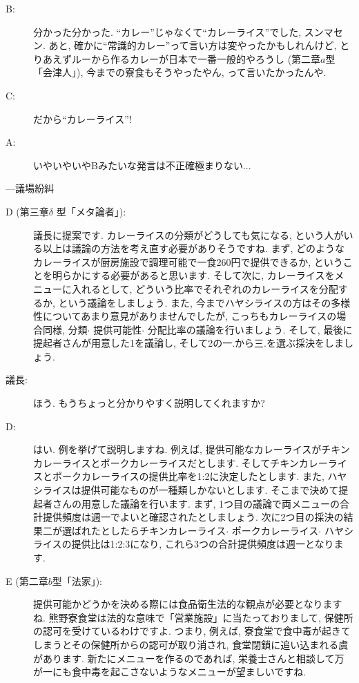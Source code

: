 \documentclass[10pt,b5jsbook,dvips,dvipdfmx,openany]{jsbook}
\theoremstyle{definition}
\begin{document}
\begin{multicols}{2}
\begin{description}
		\item[B: ] 分かった分かった. ``カレー''じゃなくて``カレーライス''でした, スンマセン. あと, 確かに``常識的カレー''って言い方は変やったかもしれんけど, とりあえずルーから作るカレーが日本で一番一般的やろうし (第二章$a$型「会津人」), 今までの寮食もそうやったやん, って言いたかったんや.

		\item[C: ]だから``カレーライス''!
		\item[A: ]いやいやいやBみたいな発言は不正確極まりない...

		\end{description}

		---議場紛糾

		\begin{description}

		\item[D (第三章$ \delta $ 型「メタ論者」): ]議長に提案です. カレーライスの分類がどうしても気になる, という人がいる以上は議論の方法を考え直す必要がありそうですね. まず, どのようなカレーライスが厨房施設で調理可能で一食260円で提供できるか, ということを明らかにする必要があると思います. そして次に, カレーライスをメニューに入れるとして, どういう比率でそれぞれのカレーライスを分配するか, という議論をしましょう. また, 今までハヤシライスの方はその多様性についてあまり意見がありませんでしたが, こっちもカレーライスの場合同様, 分類$ \cdot $ 提供可能性$ \cdot $ 分配比率の議論を行いましょう. そして, 最後に提起者さんが用意した1を議論し, そして2の一.から三.を選ぶ採決をしましょう.

		\item[議長: ]ほう. もうちょっと分かりやすく説明してくれますか?

		\item[D: ]はい. 例を挙げて説明しますね. 例えば, 提供可能なカレーライスがチキンカレーライスとポークカレーライスだとします. そしてチキンカレーライスとポークカレーライスの提供比率を1:2に決定したとします. また, ハヤシライスは提供可能なものが一種類しかないとします. そこまで決めて提起者さんの用意した議論を行います. まず, 1つ目の議論で両メニューの合計提供頻度は週一でよいと確認されたとしましょう. 次に2つ目の採決の結果二が選ばれたとしたらチキンカレーライス$ \cdot $ ポークカレーライス$ \cdot $ ハヤシライスの提供比は1:2:3になり, これら3つの合計提供頻度は週一となります.

		\item[E (第二章$b$型「法家」): ]提供可能かどうかを決める際には食品衛生法的な観点が必要となりますね. 熊野寮食堂は法的な意味で「営業施設」に当たっておりまして, 保健所の認可を受けているわけですよ. つまり, 例えば, 寮食堂で食中毒が起きてしまうとその保健所からの認可が取り消され, 食堂閉鎖に追い込まれる虞があります. 新たにメニューを作るのであれば, 栄養士さんと相談して万が一にも食中毒を起こさないようなメニューが望ましいですね.


\end{description}
\end{multicols}
\end{document}
